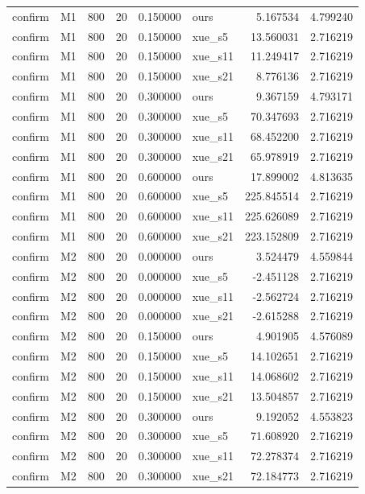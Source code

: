 \begin{longtable}{llrrrlrr}
confirm & M1 & 800 & 20 & 0.150000 & ours & 5.167534 & 4.799240 \\
confirm & M1 & 800 & 20 & 0.150000 & xue\_s5 & 13.560031 & 2.716219 \\
confirm & M1 & 800 & 20 & 0.150000 & xue\_s11 & 11.249417 & 2.716219 \\
confirm & M1 & 800 & 20 & 0.150000 & xue\_s21 & 8.776136 & 2.716219 \\
confirm & M1 & 800 & 20 & 0.300000 & ours & 9.367159 & 4.793171 \\
confirm & M1 & 800 & 20 & 0.300000 & xue\_s5 & 70.347693 & 2.716219 \\
confirm & M1 & 800 & 20 & 0.300000 & xue\_s11 & 68.452200 & 2.716219 \\
confirm & M1 & 800 & 20 & 0.300000 & xue\_s21 & 65.978919 & 2.716219 \\
confirm & M1 & 800 & 20 & 0.600000 & ours & 17.899002 & 4.813635 \\
confirm & M1 & 800 & 20 & 0.600000 & xue\_s5 & 225.845514 & 2.716219 \\
confirm & M1 & 800 & 20 & 0.600000 & xue\_s11 & 225.626089 & 2.716219 \\
confirm & M1 & 800 & 20 & 0.600000 & xue\_s21 & 223.152809 & 2.716219 \\
confirm & M2 & 800 & 20 & 0.000000 & ours & 3.524479 & 4.559844 \\
confirm & M2 & 800 & 20 & 0.000000 & xue\_s5 & -2.451128 & 2.716219 \\
confirm & M2 & 800 & 20 & 0.000000 & xue\_s11 & -2.562724 & 2.716219 \\
confirm & M2 & 800 & 20 & 0.000000 & xue\_s21 & -2.615288 & 2.716219 \\
confirm & M2 & 800 & 20 & 0.150000 & ours & 4.901905 & 4.576089 \\
confirm & M2 & 800 & 20 & 0.150000 & xue\_s5 & 14.102651 & 2.716219 \\
confirm & M2 & 800 & 20 & 0.150000 & xue\_s11 & 14.068602 & 2.716219 \\
confirm & M2 & 800 & 20 & 0.150000 & xue\_s21 & 13.504857 & 2.716219 \\
confirm & M2 & 800 & 20 & 0.300000 & ours & 9.192052 & 4.553823 \\
confirm & M2 & 800 & 20 & 0.300000 & xue\_s5 & 71.608920 & 2.716219 \\
confirm & M2 & 800 & 20 & 0.300000 & xue\_s11 & 72.278374 & 2.716219 \\
confirm & M2 & 800 & 20 & 0.300000 & xue\_s21 & 72.184773 & 2.716219 \\

\end{longtable}
